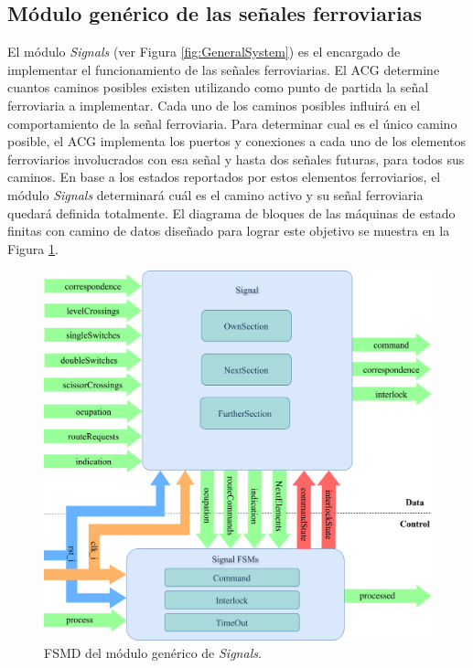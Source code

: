 \subsection{Módulo genérico de las señales ferroviarias}
	\label{sec:ACG_sig}
	
	El módulo \textit{Signals} (ver Figura \ref{fig:GeneralSystem}) es el encargado de implementar el funcionamiento de las señales ferroviarias. El ACG determine cuantos caminos posibles existen utilizando como punto de partida la señal ferroviaria a implementar. Cada uno de los caminos posibles influirá en el comportamiento de la señal ferroviaria. Para determinar cual es el único camino posible, el ACG implementa los puertos y conexiones a cada uno de los elementos ferroviarios involucrados con esa señal y hasta dos señales futuras, para todos sus caminos. En base a los estados reportados por estos elementos ferroviarios, el módulo \textit{Signals} determinará cuál es el camino activo y su señal ferroviaria quedará definida totalmente. El diagrama de bloques de las máquinas de estado finitas con camino de datos diseñado para lograr este objetivo se muestra en la Figura \ref{fig:SIG_module}.
	
	\begin{figure}[H]
		\centering
		\includegraphics[width=1\textwidth]{Figuras/SIG_module}
		\centering\caption{FSMD del módulo genérico de \textit{Signals}.}
		\label{fig:SIG_module}
	\end{figure}
	
